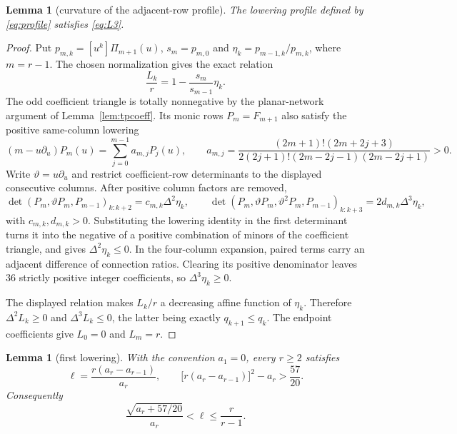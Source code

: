 \documentclass[11pt,a4paper]{article}
\theoremstyle{plain}
\newtheorem{lemma}[theorem]{Lemma}
\theoremstyle{definition}
\theoremstyle{remark}
\begin{document}
\begin{lemma}[curvature of the adjacent-row profile]\label{lem:profilecurv}
The lowering profile defined by \eqref{eq:profile} satisfies \eqref{eq:L3}.
\end{lemma}

\begin{proof}
Put $p_{m,k}=[u^k]\Pi_{m+1}(u)$, $s_m=p_{m,0}$ and
$\eta_k=p_{m-1,k}/p_{m,k}$, where $m=r-1$. The chosen normalization gives the
exact relation
\[
  \frac{L_k}{r}=1-\frac{s_m}{s_{m-1}}\eta_k.
\]
The odd coefficient triangle is totally nonnegative by the planar-network
argument of Lemma~\ref{lem:tpcoeff}. Its monic rows
$P_m=F_{m+1}$ also satisfy the positive same-column lowering
\[
  (m-u\partial_u)P_m(u)=\sum_{j=0}^{m-1}a_{m,j}P_j(u),
  \qquad
  a_{m,j}=\frac{(2m+1)!(2m+2j+3)}
  {2(2j+1)!(2m-2j-1)(2m-2j+1)}>0.
\]
Write $\vartheta=u\partial_u$ and restrict coefficient-row determinants to the
displayed consecutive columns. After positive column factors are removed,
\[
 \det(P_m,\vartheta P_m,P_{m-1})_{k:k+2}
   =c_{m,k}\Delta^2\eta_k,
 \qquad
 \det(P_m,\vartheta P_m,\vartheta^2P_m,P_{m-1})_{k:k+3}
   =2d_{m,k}\Delta^3\eta_k,
\]
with $c_{m,k},d_{m,k}>0$. Substituting the lowering identity in the first
determinant turns it into the negative of a positive combination of minors of
the coefficient triangle, and gives $\Delta^2\eta_k\le0$. In the four-column
expansion, paired terms carry an adjacent difference of connection ratios.
Clearing its positive denominator leaves $36$ strictly positive integer
coefficients, so $\Delta^3\eta_k\ge0$.

The displayed relation makes $L_k/r$ a decreasing affine function of $\eta_k$.
Therefore $\Delta^2L_k\ge0$ and
$\Delta^3L_k\le0$, the latter being exactly $q_{k+1}\le q_k$. The endpoint
coefficients give $L_0=0$ and $L_m=r$.
\end{proof}

\begin{lemma}[first lowering]\label{lem:firstlower}
With the convention $a_1=0$, every $r\ge2$ satisfies
\[
  \ell=\frac{r(a_r-a_{r-1})}{a_r},
  \qquad
  \bigl[r(a_r-a_{r-1})\bigr]^2-a_r>\frac{57}{20}.
\]
Consequently
\begin{equation}\label{eq:ellbounds}
  \frac{\sqrt{a_r+57/20}}{a_r}<\ell\le\frac{r}{r-1}.
\end{equation}
\end{lemma}
\end{document}
